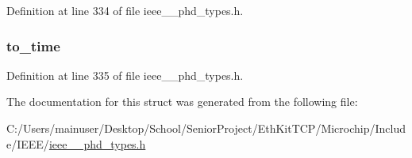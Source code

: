 Definition at line 334 of file ieee\+\_\+\_\+phd\+\_\+types.\+h.

\hypertarget{struct___abs_time_range_a1335ed62b8d883e19b80f371e5d2c730}{}
\subsubsection[{to\+\_\+time}]{ to\+\_\+time}\label{struct___abs_time_range_a1335ed62b8d883e19b80f371e5d2c730}


Definition at line 335 of file ieee\+\_\+\_\+phd\+\_\+types.\+h.



The documentation for this struct was generated from the following file\+:\begin{DoxyCompactItemize}
\item 
C\+:/\+Users/mainuser/\+Desktop/\+School/\+Senior\+Project/\+Eth\+Kit\+T\+C\+P/\+Microchip/\+Include/\+I\+E\+E\+E/\hyperlink{ieee__11073__phd__types_8h}{ieee\+\_\+\_\+phd\+\_\+types.\+h}\end{DoxyCompactItemize}
